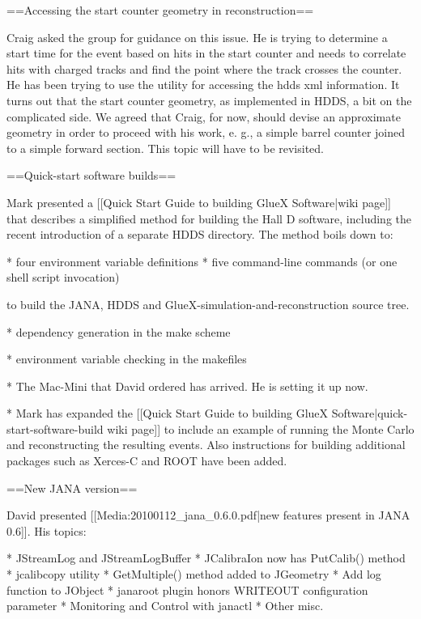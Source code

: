 \documentclass[xcolor=dvipsnames]{beamer}
\begin{document}
{==Accessing the start counter geometry in reconstruction==

Craig asked the group for guidance on this issue. He is trying to determine a start time for the event based on hits in the start counter and needs to correlate hits with charged tracks and find the point where the track crosses the counter. He has been trying to use the utility for accessing the hdds xml information. It turns out that the start counter geometry, as implemented in HDDS, a bit on the complicated side. We agreed that Craig, for now, should devise an approximate geometry in order to proceed with his work, e. g., a simple barrel counter joined to a simple forward section. This topic will have to be revisited.

==Quick-start software builds==

Mark presented a [[Quick Start Guide to building GlueX Software|wiki page]] that describes a simplified method for building the Hall D software, including the recent introduction of a separate HDDS directory. The method boils down to:

* four environment variable definitions
* five command-line commands (or one shell script invocation)

to build the JANA, HDDS and GlueX-simulation-and-reconstruction source tree.

* dependency generation in the make scheme

* environment variable checking in the makefiles

* The Mac-Mini that David ordered has arrived. He is setting it up now.

* Mark has expanded the [[Quick Start Guide to building GlueX Software|quick-start-software-build wiki page]] to include an example of running the Monte Carlo and reconstructing the resulting events. Also instructions for building additional packages such as Xerces-C and ROOT have been added.

==New JANA version==

David presented [[Media:20100112_jana_0.6.0.pdf|new features present in JANA 0.6]]. His topics:

* JStreamLog and JStreamLogBuﬀer
* JCalibraIon now has PutCalib() method
* jcalibcopy utility
* GetMultiple() method added to JGeometry
* Add log function to JObject
* janaroot plugin honors WRITEOUT conﬁguration parameter 
* Monitoring and Control with janactl 
* Other misc.

}
\end{document}
